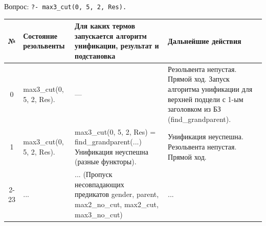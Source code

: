 \clearpage
Вопрос: \texttt{?- max3\_cut(0, 5, 2, Res).}

\begin{tabularx}{\textwidth}{|c|>{\small}X|>{\small}X|>{\small}X|}
	\hline
	\textbf{№}                                                                                     &
	\textbf{Состояние резольвенты}                                                                 &
	\textbf{Для каких термов запускается алгоритм унификации, результат и подстановка}             &
	\textbf{Дальнейшие действия}                                                                     \\
	\hline

	0                                                                                              &
	max3\_cut(0, 5, 2, Res).                                                                       &
	—                                                                                              &
	Резольвента непустая. \newline
	Прямой ход. \newline
	Запуск алгоритма унификации для верхней подцели с 1-ым заголовком из БЗ (find\_grandparent).     \\
	\hline

	1                                                                                              &
	max3\_cut(0, 5, 2, Res).                                                                       &
	max3\_cut(0, 5, 2, Res) = \newline
	find\_grandparent(...) \newline
	Унификация неуспешна (разные функторы).                                                        &
	Унификация неуспешна. \newline
	Резольвента непустая. \newline
	Прямой ход.                                                                                      \\
	\hline

	2-23                                                                                           &
	...                                                                                            &
	... (Пропуск несовпадающих предикатов gender, parent, max2\_no\_cut, max2\_cut, max3\_no\_cut) &
	...                                                                                              \\
	\hline


\end{tabularx}
